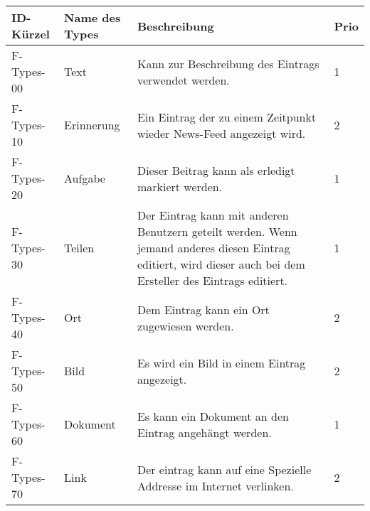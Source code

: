 \begin{tabularx}{\textwidth}{|l|l|X|l|}
    \toprule
    \textbf{ID-Kürzel} & \textbf{Name des Types} & \textbf{Beschreibung} & \textbf{Prio}\\
    \midrule
    \endhead
    \hline
    \caption{Typen von Einträgen}
    \label{funktionen:typen}
    \endfoot
    F-Types-00 & Text & Kann zur Beschreibung des Eintrags verwendet werden. & 1\\
    F-Types-10 & Erinnerung & Ein Eintrag der zu einem Zeitpunkt wieder News-Feed angezeigt wird. & 2 \\
    F-Types-20 & Aufgabe & Dieser Beitrag kann als erledigt markiert werden. & 1\\
    F-Types-30 & Teilen & Der Eintrag kann mit anderen Benutzern geteilt werden.
    Wenn jemand anderes diesen Eintrag editiert, wird dieser auch bei dem Ersteller des Eintrags editiert. & 1\\
    F-Types-40 & Ort & Dem Eintrag kann ein Ort zugewiesen werden. & 2 \\
    F-Types-50 & Bild & Es wird ein Bild in einem Eintrag angezeigt. & 2 \\
    F-Types-60 & Dokument & Es kann ein Dokument an den Eintrag angehängt werden. & 1\\
    F-Types-70 & Link & Der eintrag kann auf eine Spezielle Addresse im Internet verlinken. & 2\\
\end{tabularx}

